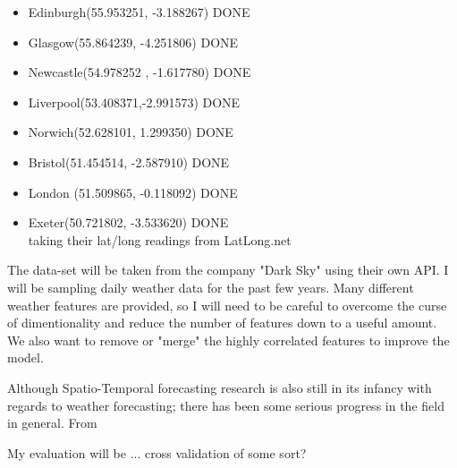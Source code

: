 \begin{itemize}
    

\item Edinburgh(55.953251, -3.188267) DONE
\item Glasgow(55.864239, -4.251806) DONE
\item Newcastle(54.978252 , -1.617780) DONE
\item Liverpool(53.408371,-2.991573) DONE 
\item Norwich(52.628101, 1.299350) DONE
\item Bristol(51.454514, -2.587910) DONE
\item London (51.509865, -0.118092) DONE
\item Exeter(50.721802, -3.533620) DONE\\ 
taking their lat/long readings from LatLong.net
\end{itemize}
  
  

The data-set will be taken from the company "Dark Sky" using their own API. I will be sampling daily weather data for the past few years. Many different weather features are provided, so I will need to be careful to overcome the curse of dimentionality and reduce the number of features down to a useful amount. We also want to remove or "merge" the highly correlated features to improve the model.


    

Although Spatio-Temporal forecasting research is also still in its infancy with regards to weather forecasting; there has been some serious progress in the field in general. From 





My evaluation will be ... cross validation of some sort?
